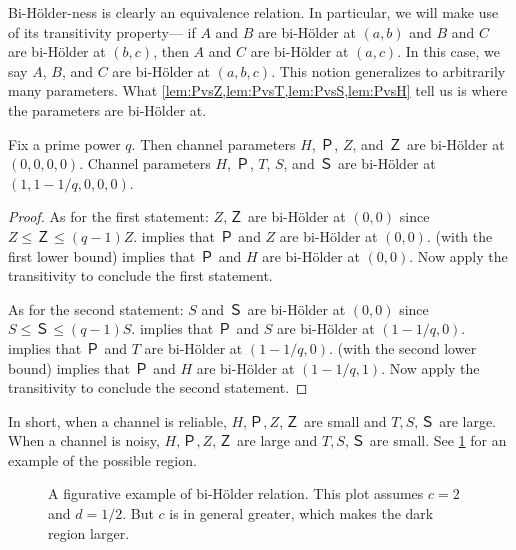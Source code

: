 \documentclass[openany]{amsbook}
\numberwithin{equation}{chapter}
\numberwithin{figure}{chapter}
\numberwithin{table}{chapter}
\theoremstyle{definition}	理dfn:Definition~?s			理exa:Example~?s
\theoremstyle{remark}		理cla:Claim~?s				理rem:Remark~?s
\begin{document}
	Bi-Hölder-ness is clearly an equivalence relation.
	In particular, we will make use of its transitivity property---%
	if $A$ and $B$ are bi-Hölder at $(a,b)$ and $B$ and $C$ are bi-Hölder at $(b,c)$,
	then $A$ and $C$ are bi-Hölder at $(a,c)$.
	In this case, we say $A$, $B$, and $C$ are bi-Hölder at $(a,b,c)$.
	This notion generalizes to arbitrarily many parameters.
	What \cref{lem:PvsZ,lem:PvsT,lem:PvsS,lem:PvsH} tell us
	is where the parameters are bi-Hölder at.
	
	\begin{pro}\label{pro:im-toll}
		Fix a prime power $q$.
		Then channel parameters $H$, $Ｐ$, $Z$, and $Ｚ$ are bi-Hölder at $(0,0,0,0)$.
		Channel parameters $H$, $Ｐ$, $T$, $S$, and $Ｓ$
		are bi-Hölder at $(1,1-1/q,0,0,0)$.
	\end{pro}
	
	\begin{proof}
		As for the first statement:
		$Z,Ｚ$ are bi-Hölder at $(0,0)$ since $Z≤Ｚ≤(q-1)Z$.
		 implies that $Ｐ$ and $Z$ are bi-Hölder at $(0,0)$.
		 (with the first lower bound)
		implies that $Ｐ$ and $H$ are bi-Hölder at $(0,0)$.
		Now apply the transitivity to conclude the first statement.
		
		As for the second statement:
		$S$ and $Ｓ$ are bi-Hölder at $(0,0)$ since $S≤Ｓ≤(q-1)S$.
		 implies that $Ｐ$ and $S$ are bi-Hölder at $(1-1/q,0)$.
		 implies that $Ｐ$ and $T$ are bi-Hölder at $(1-1/q,0)$.
		 (with the second lower bound)
		implies that $Ｐ$ and $H$ are bi-Hölder at $(1-1/q,1)$.
		Now apply the transitivity to conclude the second statement.
	\end{proof}
	
	In short, when a channel is reliable, $H,Ｐ,Z,Ｚ$ are small and $T,S,Ｓ$ are large.
	When a channel is noisy, $H,Ｐ,Z,Ｚ$ are large and $T,S,Ｓ$ are small.
	See \cref{fig:holder} for an example of the possible region.
	
	\begin{figure}
		\caption{
			A figurative example of bi-Hölder relation.
			This plot assumes $c=2$ and $d=1/2$.
			But $c$ is in general greater, which makes the dark region larger.
		}\label{fig:holder}
	\end{figure}
	
\end{document}
